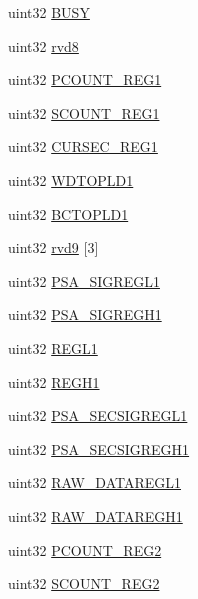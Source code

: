 \begin{DoxyCompactItemize}
\item 
uint32 \mbox{\hyperlink{structcrcBase_a8edcf649571f9813f48a79602a3915dc}{B\+U\+SY}}
\item 
uint32 \mbox{\hyperlink{structcrcBase_ab0d501707089ccad5da2cbd62732b49b}{rvd8}}
\item 
uint32 \mbox{\hyperlink{structcrcBase_a3b58f09a99541a11fdf3223a331d47bb}{P\+C\+O\+U\+N\+T\+\_\+\+R\+E\+G1}}
\item 
uint32 \mbox{\hyperlink{structcrcBase_a69ef9f31c0e0c741996e7fce98992fa8}{S\+C\+O\+U\+N\+T\+\_\+\+R\+E\+G1}}
\item 
uint32 \mbox{\hyperlink{structcrcBase_a46b85cd182a9f9b06a65c96353f22127}{C\+U\+R\+S\+E\+C\+\_\+\+R\+E\+G1}}
\item 
uint32 \mbox{\hyperlink{structcrcBase_a2ddcfc8b64176b74dae6f32f0cf2e5e7}{W\+D\+T\+O\+P\+L\+D1}}
\item 
uint32 \mbox{\hyperlink{structcrcBase_a169322e66edb9affc7625f1d186005e5}{B\+C\+T\+O\+P\+L\+D1}}
\item 
uint32 \mbox{\hyperlink{structcrcBase_a86a0ebb68f02099db29eb94155e167f1}{rvd9}} \mbox{[}3\mbox{]}
\item 
uint32 \mbox{\hyperlink{structcrcBase_a9c41be1368743efae2bf8cf201a1974d}{P\+S\+A\+\_\+\+S\+I\+G\+R\+E\+G\+L1}}
\item 
uint32 \mbox{\hyperlink{structcrcBase_a24b764718edb3c39f3174203d435072a}{P\+S\+A\+\_\+\+S\+I\+G\+R\+E\+G\+H1}}
\item 
uint32 \mbox{\hyperlink{structcrcBase_a01161aa3b05450d54d12c62c86f4a766}{R\+E\+G\+L1}}
\item 
uint32 \mbox{\hyperlink{structcrcBase_a2ef4e1210222c3e4a28743154fe061cc}{R\+E\+G\+H1}}
\item 
uint32 \mbox{\hyperlink{structcrcBase_af356d76e3873d8596b6b23296ce96d0f}{P\+S\+A\+\_\+\+S\+E\+C\+S\+I\+G\+R\+E\+G\+L1}}
\item 
uint32 \mbox{\hyperlink{structcrcBase_ae38d32aa66e598961528dde80bb5e0e9}{P\+S\+A\+\_\+\+S\+E\+C\+S\+I\+G\+R\+E\+G\+H1}}
\item 
uint32 \mbox{\hyperlink{structcrcBase_a11ad3ee22efd150b755b414780f69bf8}{R\+A\+W\+\_\+\+D\+A\+T\+A\+R\+E\+G\+L1}}
\item 
uint32 \mbox{\hyperlink{structcrcBase_ab212cad2007e99abaf3fc801e0050ee6}{R\+A\+W\+\_\+\+D\+A\+T\+A\+R\+E\+G\+H1}}
\item 
uint32 \mbox{\hyperlink{structcrcBase_aa77610a5e140560b0ef11b80673594e2}{P\+C\+O\+U\+N\+T\+\_\+\+R\+E\+G2}}
\item 
uint32 \mbox{\hyperlink{structcrcBase_a1b9ada658942210b165ff0c697b5c02d}{S\+C\+O\+U\+N\+T\+\_\+\+R\+E\+G2}}

\end{DoxyCompactItemize}
